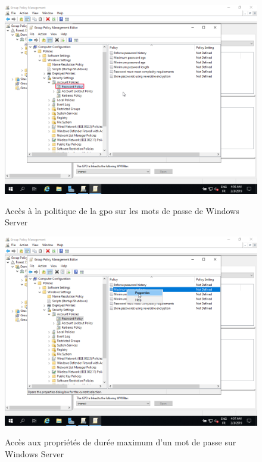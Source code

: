 \begin{figure}[h!]
	\begin{center}
		\caption{Accès à la politique de la gpo sur les mots de passe de Windows Server}
		\includegraphics[scale=0.5]{WS_Screenshots/gpo_4.png}
		\label{WS_Screenshots/gpo_4}
	\end{center}
\end{figure}
\FloatBarrier 
    

\begin{figure}[h!]
	\begin{center}
		\caption{Accès aux propriétés de durée maximum d'un mot de passe sur Windows Server}
		\includegraphics[scale=0.5]{WS_Screenshots/gpo_5.png}
		\label{WS_Screenshots/gpo_5}
	\end{center}
\end{figure}
\FloatBarrier 
    

